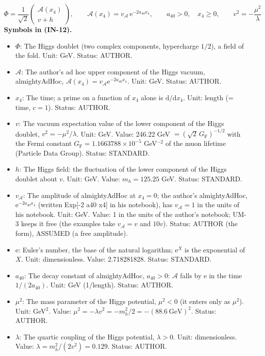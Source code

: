 \documentclass[
  10pt,
]{article}
\providecommand{\tightlist}{%
  \setlength{\itemsep}{0pt}\setlength{\parskip}{0pt}}
\begin{document}
\[
\Phi = \frac{1}{\sqrt2}\begin{pmatrix}\mathcal{A}(x_4)\\ v + h\end{pmatrix},\qquad
\mathcal{A}(x_4) = v_{\mathcal{A}}\,\mathrm{e}^{-2a_{40}x_4},\qquad a_{40} > 0,\quad x_4 \ge 0,\qquad v^2 = -\frac{\mu^2}{\lambda} \tag{IN-12}
\] \textbf{Symbols in (IN-12).}

\begin{itemize}
\tightlist
\item
  \(\Phi\): The Higgs doublet (two complex components, hypercharge
  \(1/2\)), a field of the fold. Unit: GeV. Status: AUTHOR.
\item
  \(\mathcal{A}\): The author's ad hoc upper component of the Higgs
  vacuum, almightyAdHoc,
  \(\mathcal{A}(x_4) = v_{\mathcal{A}}\mathrm{e}^{-2a_{40}x_4}\). Unit:
  GeV. Status: AUTHOR.
\item
  \(x_4\): The time; a prime on a function of \(x_4\) alone is
  \(\mathrm{d}/\mathrm{d}x_4\). Unit: length (= time, \(c = 1\)).
  Status: AUTHOR.
\item
  \(v\): The vacuum expectation value of the lower component of the
  Higgs doublet, \(v^2 = -\mu^2/\lambda\). Unit: GeV. Value: 246.22 GeV
  \(= (\sqrt2\,G_{\mathrm{F}})^{-1/2}\) with the Fermi constant
  \(G_{\mathrm{F}} = 1.1663788\times10^{-5}\) GeV\(^{-2}\) of the muon
  lifetime (Particle Data Group). Status: STANDARD.
\item
  \(h\): The Higgs field: the fluctuation of the lower component of the
  Higgs doublet about \(v\). Unit: GeV. Value: \(m_h = 125.25\) GeV.
  Status: STANDARD.
\item
  \(v_{\mathcal{A}}\): The amplitude of almightyAdHoc at \(x_4 = 0\);
  the author's almightyAdHoc, \(\mathrm{e}^{-2a_{40}x_4}\) (written
  Exp{[}-2 a40 x4{]} in his notebook), has \(v_{\mathcal{A}} = 1\) in
  the units of his notebook. Unit: GeV. Value: 1 in the units of the
  author's notebook; UM-3 keeps it free (the examples take
  \(v_{\mathcal{A}} = v\) and \(10v\)). Status: AUTHOR (the form),
  ASSUMED (a free amplitude).
\item
  \(\mathrm{e}\): Euler's number, the base of the natural logarithm;
  \(\mathrm{e}^{X}\) is the exponential of \(X\). Unit: dimensionless.
  Value: 2.718281828. Status: STANDARD.
\item
  \(a_{40}\): The decay constant of almightyAdHoc, \(a_{40} > 0\):
  \(\mathcal{A}\) falls by \(\mathrm{e}\) in the time \(1/(2a_{40})\).
  Unit: GeV (1/length). Status: AUTHOR.
\item
  \(\mu^2\): The mass parameter of the Higgs potential, \(\mu^2 < 0\)
  (it enters only as \(\mu^2\)). Unit: GeV\(^2\). Value:
  \(\mu^2 = -\lambda v^2 = -m_h^2/2 = -(88.6\ \mathrm{GeV})^2\). Status:
  AUTHOR.
\item
  \(\lambda\): The quartic coupling of the Higgs potential,
  \(\lambda > 0\). Unit: dimensionless. Value:
  \(\lambda = m_h^2/(2v^2) = 0.129\). Status: AUTHOR.
\end{itemize}
\end{document}
